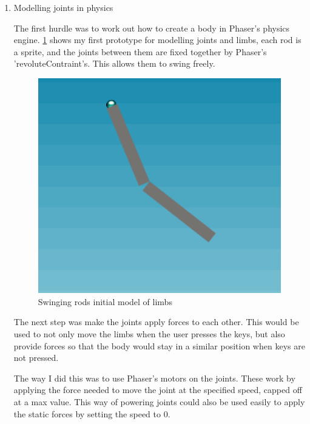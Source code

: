 \documentclass[12pt,a4paper,twoside,openright]{report}
\begin{document}
\begin{enumerate}
	\item Modelling joints in physics

	The first hurdle was to work out how to create a body in Phaser's physics engine.   
	\ref{swingingRods} shows my first prototype for modelling joints and limbs, each rod is a sprite, and the joints between them are fixed together by Phaser's 'revoluteContraint's. This allows them to swing freely.

	\begin{figure}[tbh]
	\centerline{\includegraphics[scale=0.5]{swingingRods.PNG}}
	\caption{Swinging rods initial model of limbs}
	\label{swingingRods}
	\end{figure}

	The next step was make the joints apply forces to each other. This would be used to not only move the limbs when the user presses the keys, but also provide forces so that the body would stay in a similar position when keys are not pressed.

	The way I did this was to use Phaser's motors on the joints. These work by applying the force needed to move the joint at the specified speed, capped off at a max value. This way of powering joints could also be used easily to apply the static forces by setting the speed to 0.




\end{enumerate}
\end{document}
